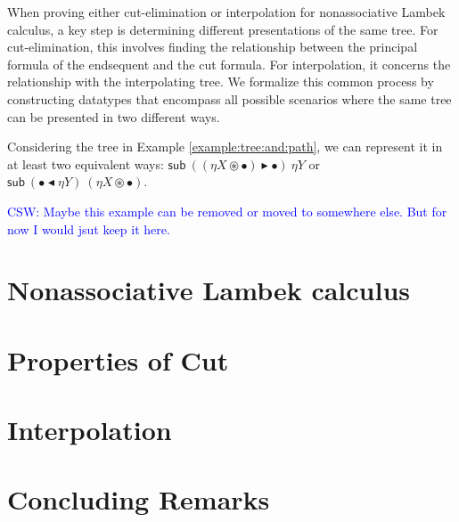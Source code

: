 \documentclass[runningheads]{llncs}
\newcommand{\cdast}{\circledast}
\newcommand{\btleft}{\blacktriangleleft}
\newcommand{\btright}{\blacktriangleright}
\newcommand{\sub}[2]{\mathsf{sub} ~ #1 ~ #2}
\newcommand{\cheng}[1]{\textcolor{blue}{CSW: #1}}
\begin{document}
When proving either cut-elimination or interpolation for nonassociative Lambek calculus, a key step is determining different presentations of the same tree. For cut-elimination, this involves finding the relationship between the principal formula of the endsequent and the cut formula. For interpolation, it concerns the relationship with the interpolating tree. We formalize this common process by constructing datatypes that encompass all possible scenarios where the same tree can be presented in two different ways.
\begin{example}\label{example:same:tree:diff:sub}
  Considering the tree in Example \ref{example:tree:and:path}, we can represent it in at least two equivalent ways: $\sub{((\eta X \cdast \bullet) \btright \bullet)}{\eta Y}$ or $\sub{(\bullet \btleft \eta Y)}{(\eta X \cdast \bullet)}$.
\end{example}\cheng{Maybe this example can be removed or moved to somewhere else. But for now I would jsut keep it here.}


\section{Nonassociative Lambek calculus}\label{sec:calculus}

\section{Properties of Cut}

\section{Interpolation}

\section{Concluding Remarks}
\end{document}
